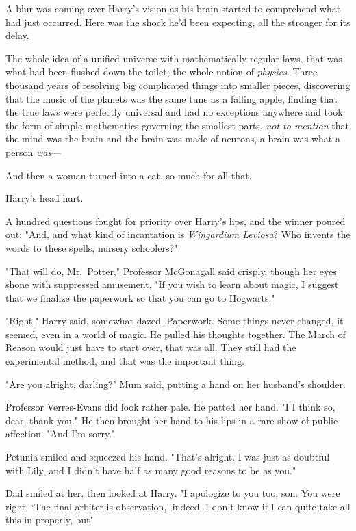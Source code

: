 A blur was coming over Harry’s vision as his brain started to comprehend what 
had just occurred. Here was the shock he’d been expecting, all the stronger 
for its delay.

The whole idea of a unified universe with mathematically
regular laws, that was what had been flushed down the toilet; the whole notion
of \emph{physics}. Three thousand years of resolving big complicated things
into smaller pieces, discovering that the music of the planets was the same
tune as a falling apple, finding that the true laws were perfectly universal
and had no exceptions anywhere and took the form of simple mathematics governing the
smallest parts, \emph{not to mention} that the mind was the brain and the brain
was made of neurons, a brain was what a person \emph{was}—

And then a woman turned into a cat, so much for all that.

Harry’s head hurt.

A hundred questions fought for priority over Harry's lips, and the winner poured
out: "And, and what kind of incantation is \emph{Wingardium Leviosa}? Who
invents the words to these spells, nursery schoolers?"

"That will do, Mr.~Potter," Professor McGonagall said crisply, though her eyes
shone with suppressed amusement. "If you wish to learn about magic, I suggest
that we finalize the paperwork so that you can go to Hogwarts."

"Right," Harry said, somewhat dazed. Paperwork. Some things
never changed, it seemed, even in a world of magic.
He pulled his thoughts together. The March
of Reason would just have to start over, that was all.
They still had the experimental method, and that was the important thing.

"Are you alright, darling?" Mum said, putting a hand on her
husband's shoulder.

Professor Verres-Evans did look rather pale. He patted her
hand. "I{\el} I think so, dear, thank you." He then brought
her hand to his lips in a rare show of public affection.
"And{\el} I'm sorry."

Petunia smiled and squeezed his hand. "That's alright. I
was just as doubtful with Lily, and I didn't have half as
many good reasons to be as you."

Dad smiled at her, then looked at Harry. "I apologize to
you too, son. You were right. `The final arbiter is
observation,' indeed. I don't know if I can quite take all
this in properly, but{\el}"

